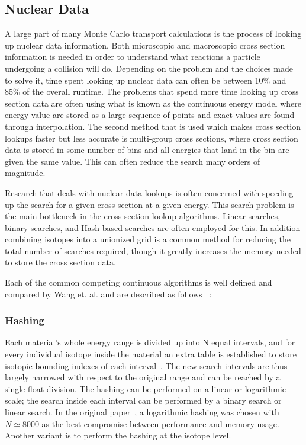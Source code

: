 \subsection{\textbf{Nuclear Data}}

A large part of many Monte Carlo transport calculations is the process of looking up nuclear data information.
%
Both microscopic and macroscopic cross section information is needed in order to understand what reactions a particle undergoing a collision will do.
%
Depending on the problem and the choices made to solve it, time spent looking up nuclear data can often be between 10\% and 85\% of the overall runtime.
%
The problems that spend more time looking up cross section data are often using what is known as the continuous energy model where energy value are stored as a large sequence of points and exact values are found through interpolation.
%
The second method that is used which makes cross section lookups faster but less accurate is multi-group cross sections, where cross section data is stored in some number of bins and all energies that land in the bin are given the same value.
%
This can often reduce the search many orders of magnitude.
%

%
Research that deals with nuclear data lookups is often concerned with speeding up the search for a given cross section at a given energy.
%
This search problem is the main bottleneck in the cross section lookup algorithms.
%
Linear searches, binary searches, and Hash based searches are often employed for this.
%
In addition combining isotopes into a unionized grid is a common method for reducing the total number of searches required, though it greatly increases the memory needed to store the cross section data.
%

Each of the common competing continuous algorithms is well defined and compared by Wang et. al. and are described as follows ~\cite{wang2016competing}:
%
\subsubsection*{ \textbf{Hashing} } Each material's whole energy range is divided up into N equal intervals, and for every individual isotope inside the material an extra table is established to store isotopic bounding indexes of each interval~\cite{brown2014new}. The new search intervals are thus largely narrowed with respect to the original range and can be reached by a single float division. The hashing can be performed on a linear or logarithmic scale; the search inside each interval can be performed by a binary search or linear search. In the original paper~\cite{brown2014new}, a logarithmic hashing was chosen with $ N \simeq 8000 $ as the best compromise between performance and memory usage. Another variant is to perform the hashing at the isotope level.
%
